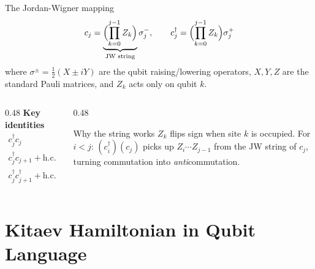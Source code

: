 \documentclass[aspectratio=169, 12pt]{beamer}
\begin{document}
\begin{frame}{The Jordan-Wigner mapping}
  \begin{equation}
    c_j = \underbrace{\Bigl(\prod_{k=0}^{j-1} Z_k\Bigr)}_{\text{JW string}}
          \sigma_j^-, \qquad
    c_j^\dagger = \Bigl(\prod_{k=0}^{j-1} Z_k\Bigr) \sigma_j^+
  \end{equation}
  where $\sigma^{\pm} = \tfrac{1}{2}(X \pm iY)$ are the qubit raising/lowering
  operators, $X, Y, Z$ are the standard Pauli matrices, and $Z_k$ acts only on qubit $k$.

  \vspace{-0.5em}
  \begin{columns}[T]
    \begin{column}{0.48\textwidth}
      \textbf{Key identities}
      \begin{align*}
        c_j^\dagger c_j &= \frac{I + Z_j}{2} \quad \text{(number op.)}\\
        c_j^\dagger c_{j+1} + \mathrm{h.c.}
          &= -\frac{X_j X_{j+1} + Y_j Y_{j+1}}{2}\\
        c_j^\dagger c_{j+1}^\dagger + \mathrm{h.c.}
          &= -\frac{X_j X_{j+1} - Y_j Y_{j+1}}{2}
      \end{align*}
    \end{column}
    \begin{column}{0.48\textwidth}
      \begin{alertblock}{Why the string works}
        \small
        $Z_k$ flips sign when site $k$ is occupied.
        For $i < j$: $(c_i^\dagger)(c_j)$ picks up
        $Z_i \cdots Z_{j-1}$ from the JW string of $c_j$,
        turning commutation into \emph{anti}commutation.
      \end{alertblock}
    \end{column}
  \end{columns}
\end{frame}

\section{Kitaev Hamiltonian in Qubit Language}
\end{document}
